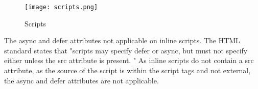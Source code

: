 \begin{figure}[h!]
\begin{center}
\texttt{[image: scripts.png]}
\caption{Scripts}
\label{img:latency}
\end{center}
\end{figure}


The async and defer attributes not applicable on inline scripts.
The HTML standard states that  "scripts may specify defer or async, but must not specify either unless the src attribute is present. " %
As inline scripts do not contain a src attribute, as the source of the script is within the script tags and not external, the async and defer attributes are not applicable.





















